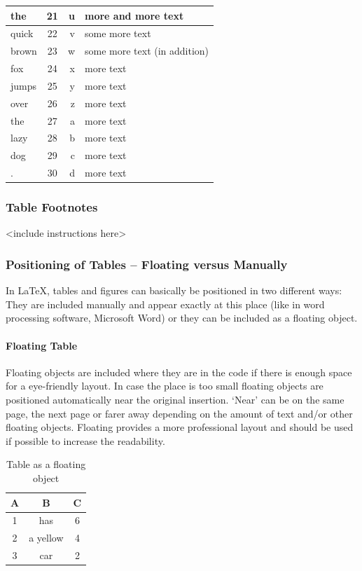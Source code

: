 \begin{tabularx}{\textwidth}{lcrX}
   the   & 21    & u     & more and more text \\ \midrule
   quick & 22    & v     & some more text \\ \midrule
   brown & 23    & w     & some more text (in addition) \\ \midrule
   fox   & 24    & x     & more text \\ \midrule
   jumps & 25    & y     & more text \\ \midrule
   over  & 26    & z     & more text \\ \midrule
   the   & 27    & a     & more text \\ \midrule
   lazy  & 28    & b     & more text \\ \midrule
   dog   & 29    & c     & more text \\ \midrule
   .     & 30    & d     & more text \\ \midrule
\end{tabularx}

\portraitformat

\subsubsection{Table Footnotes}
<include instructions here>

\subsubsection{Positioning of Tables -- Floating versus Manually}\label{subsubsec:TableFloating}
In \LaTeX, tables and figures can basically be positioned in two different ways: They are included manually
and appear exactly at this place (like in word processing software, \eg Microsoft Word) or they can be
included as a floating object.

\paragraph{Floating Table}
Floating objects are included where they are in the code if there is enough space for a eye-friendly
layout. In case the place is too small floating objects are positioned automatically near the original
insertion. `Near' can be on the same page, the next page or farer away depending on the amount of text
and/or other floating objects. Floating provides a more professional layout and should be used if
possible
to increase the readability.
\begin{table}[hbpt]
   \begin{tabular}{ccc}\toprule
      A & B & C \\\midrule
      1 & has & 6 \\
      2 & a yellow & 4 \\
      3 & car & 2 \\\bottomrule
   \end{tabular}
   \caption[short caption table]{Table as a floating object}\label{tab:tableFloatingObject}
\end{table}

